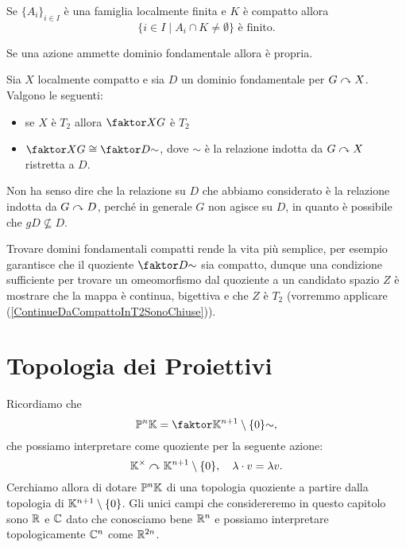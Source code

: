 \begin{multicols*}{2}
\begin{lemma}\label{FamiglieLocalmenteFiniteIncontranoCompattiFiniteVolte}
Se $\{A_i\}_{i\in I}$ \`e una famiglia localmente finita e $K$ \`e compatto allora
\[\{i\in I\mid A_i\cap K\neq \emptyset\}\text{ \`e finito.}\]
\end{lemma}

\begin{lemma}\label{AzioneConDominioFondamentaleEPropria}
Se una azione ammette dominio fondamentale allora \`e propria.
\end{lemma}


\begin{theorem}\label{LocalmenteCompattoConDominioFondamentale}
Sia $X$ localmente compatto e sia $D$ un dominio fondamentale per $G\curvearrowright X$. Valgono le seguenti:
\begin{itemize}[noitemsep]
\item se $X$ \`e $T_2$ allora $\quot XG$ \`e $T_2$
\item $\displaystyle \quot XG\cong \quot D\sim$, dove $\sim$ \`e la relazione indotta da $G\curvearrowright X$ ristretta a $D$.
\end{itemize}
\end{theorem}
\begin{remark}
Non ha senso dire che la relazione su $D$ che abbiamo considerato \`e la relazione indotta da $G\curvearrowright D$, perch\'e in generale $G$ non agisce su $D$, in quanto \`e possibile che $gD\not\subseteq D$.
\end{remark}

\begin{remark}
Trovare domini fondamentali compatti rende la vita pi\`u semplice, per esempio garantisce che il quoziente $\quot D\sim$ sia compatto, dunque una condizione sufficiente per trovare un omeomorfismo dal quoziente a un candidato spazio $Z$ \`e mostrare che la mappa \`e continua, bigettiva e che $Z$ \`e $T_2$ (vorremmo applicare (\ref{ContinueDaCompattoInT2SonoChiuse})).
\end{remark}

\section{Topologia dei Proiettivi}
Ricordiamo che
\[\Pj^n\K=\quot{\K^{n+1}\nz}\sim,\]
che possiamo interpretare come quoziente per la seguente azione:
\[\mathbb{K}^\times\curvearrowright \mathbb{K}^{n+1}\setminus\{0\},\quad \lambda\cdot v=\lambda v.\]
Cerchiamo allora di dotare $\mathbb{P}^n\mathbb{K}$ di una topologia quoziente a partire dalla topologia di $\mathbb{K}^{n+1}\setminus\{0\}$. Gli unici campi che considereremo in questo capitolo sono $\mathbb{R}$ e $\mathbb{C}$ dato che conosciamo bene $\mathbb{R}^n$ e possiamo interpretare topologicamente $\mathbb{C}^n$ come $\mathbb{R}^{2n}$.

\end{multicols*}
